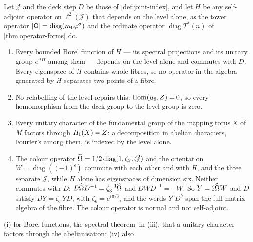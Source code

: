 \begin{proposition}\label{prop:level-operators}
Let $\mathcal J$ and the deck step $D$ be those of \cref{def:joint-index}, and
let $H$ be any self-adjoint operator on $\ell^2(\mathcal J)$ that depends on the level alone, as the tower operator
$|\mathsf{O}|=\operatorname{diag}(m_0\varphi^{\sigma})$ and the ordinate operator $\operatorname{diag}T^*(n)$ of
\cref{thm:operator-forms} do.
\begin{enumerate}[label=\textup{(\roman*)}]
  \item Every bounded Borel function of $H$ --- its spectral projections and its unitary group $e^{itH}$ among
    them --- depends on the level alone and commutes with $D$.  Every eigenspace of $H$ contains whole fibres, so no
    operator in the algebra generated by $H$ separates two points of a fibre.
  \item No relabelling of the level repairs this: $\operatorname{Hom}(\mu_6,Z)=0$, so every homomorphism from the deck group to
    the level group is zero.
  \item Every unitary character of the fundamental group of the mapping torus $X$ of $M$ factors through
    $H_1(X)=Z$: a decomposition in abelian characters, Fourier's among them, is indexed by the level alone.
  \item The colour operator $\widehat{\Omega}=1/2\operatorname{diag}(1,\zeta_3,\zeta_3^2)$ and the orientation
    $W=\operatorname{diag}((-1)^{\epsilon})$ commute with each other and with $H$, and the three separate
    $\mathcal J$, while $H$ alone has eigenspaces of dimension six.  Neither commutes with $D$:
    $D\widehat{\Omega} D^{-1}=\zeta_3^{-1}\widehat{\Omega}$ and $DWD^{-1}=-W$.  So $Y=2\widehat{\Omega} W$ and $D$ satisfy $DY=\zeta_6\,YD$, with
    $\zeta_6=e^{i\pi/3}$, and the words $Y^aD^b$ span the full matrix algebra of the fibre.  The colour operator is
    normal and not self-adjoint.
\end{enumerate}


(i) for Borel
functions, the spectral theorem; in (iii), that a unitary character factors through the abelianisation; (iv) also 
\end{proposition}


